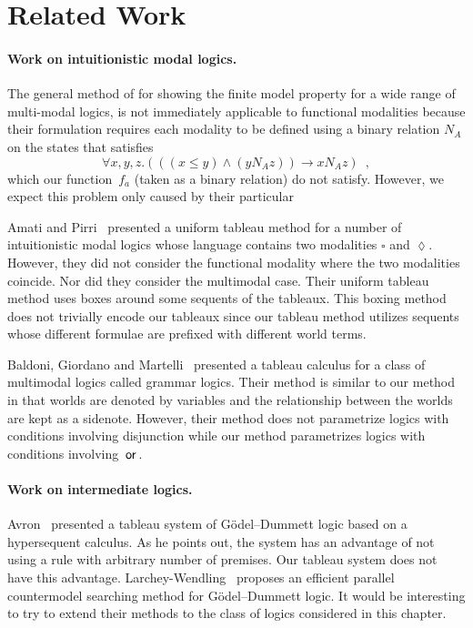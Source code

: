  \section{Related Work}

    \paragraph{Work on intuitionistic modal logics.}

    The general method of \citet{Negri::2012} for showing the finite model property
    for a wide range of multi-modal logics, is not immediately
    applicable to functional modalities because their formulation
    requires each modality to be defined using a binary relation $N_A$
    on the states that satisfies
    \[
     \forall x,y,z.(((x\le y)\land(y N_A z))\rightarrow x N_A z)\enspace,
    \]
    which our function~$f_a$ (taken as a binary relation) do not
    satisfy.
    However, we expect this problem only caused by their particular 

    Amati and Pirri~\cite{amati94} presented a uniform tableau method for a number of
    intuitionistic modal logics whose language contains two modalities
    $\square$ and $\lozenge$.
    However, they did not consider the functional modality where the two
    modalities coincide.  Nor did they consider the multimodal case.
    Their uniform tableau method uses boxes around some sequents of the
    tableaux.  This boxing method does not trivially encode our tableaux since our
    tableau method utilizes sequents whose different formulae are prefixed
    with different world terms.

    Baldoni, Giordano and Martelli~\cite{baldoni98} presented a tableau
    calculus for a class of multimodal logics called grammar logics.
    Their method is similar to our method in that worlds are denoted by
    variables and the relationship between the worlds are kept as a
    sidenote.
    However, their method does not parametrize logics with conditions involving
    disjunction while our method parametrizes logics with conditions
    involving $\,\mathbin{\mathsf{or}}\,$.

    \paragraph{Work on intermediate logics.}

    Avron~\cite{avron2000} presented a tableau system of G\"odel--Dummett logic
    based on a hypersequent calculus.
    As he points out, the system has an advantage of not using a rule with
    arbitrary number of
    premises.  Our tableau system does not have this advantage.
    Larchey-Wendling~\cite{countermodelsearch} proposes an efficient parallel
    countermodel searching method for G\"odel--Dummett logic.
    It would be interesting to try to extend their methods to the
    class of logics considered in this chapter.

